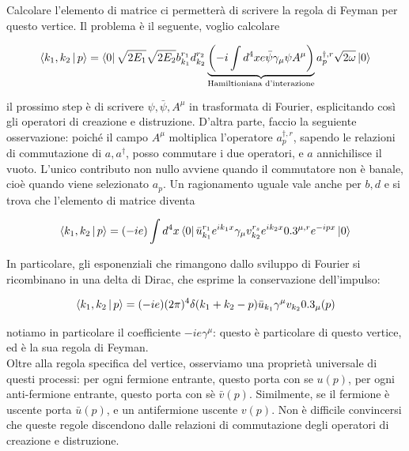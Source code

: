 \documentclass[11pt]{report}
\begin{document}
Calcolare l'elemento di matrice ci permetterà di scrivere la regola di Feyman per questo vertice. Il problema è il seguente, voglio calcolare 

\begin{align}
    \Braket{k_1, k_2 | p} = \bra{0}\sqrt{2E_1}\sqrt{2E_2}b^{r_1}_{k_1}d^{r_2}_{k_2}\underbrace{\left(-i\int d^4x e \bar{\psi}\gamma_\mu \psi A^\mu\right)}_{\text{Hamiltioniana d'interazione}}a^{\dagger, r}_{p}\sqrt{2\omega}\ket{0}
\end{align}

il prossimo step è di scrivere \(\psi, \bar{\psi}, A^\mu\) in trasformata di Fourier, esplicitando così gli operatori di creazione e distruzione. D'altra parte, faccio la seguiente osservazione: poiché il campo \(A^\mu\) moltiplica l'operatore \(a^{\dagger, r}_{p}\), sapendo le relazioni di commutazione di \(a, a^{\dagger}\), posso commutare i due operatori, e \(a\) annichilisce il vuoto. L'unico contributo non nullo avviene quando il commutatore non è banale, cioè quando viene selezionato \(a_p\). Un ragionamento uguale vale anche per \(b, d\) e si trova che l'elemento di matrice diventa 

\begin{align}
    \Braket{k_1, k_2 | p} = (-ie)\int d^4x \bra{0}\bar{u}^{r_1}_{k_1}e^{ik_1 x}\gamma_\mu v^{r_s}_{k_2}e^{ik_2 x}0.3^{\mu, r}e^{-ipx}\ket{0}
\end{align}

In particolare, gli esponenziali che rimangono dallo sviluppo di Fourier si ricombinano in una delta di Dirac, che esprime la conservazione dell'impulso: 

\begin{align}
    \Braket{k_1, k_2 | p} = (-ie)(2\pi)^4\delta(k_1 + k_2 -p)\bar{u}_{k_1}\gamma^\mu v_{k_2}0.3_{\mu}(p)
\end{align}

notiamo in particolare il coefficiente \(-ie\gamma^\mu\): questo è particolare di questo vertice, ed è la sua regola di Feyman. \\

Oltre alla regola specifica del vertice, osserviamo una proprietà universale di questi processi: per ogni fermione entrante, questo porta con se \(u(p)\), per ogni anti-fermione entrante, questo porta con sè \(\bar{v}(p)\). Similmente, se il fermione è uscente porta \(\bar{u}(p)\), e un antifermione uscente \(v(p)\). Non è difficile convincersi che queste regole discendono dalle relazioni di commutazione degli operatori di creazione e distruzione. 
\end{document}

